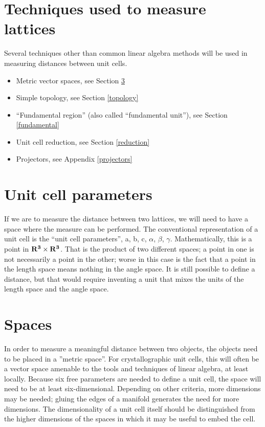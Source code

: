 \documentclass[preprint]{iucr}              %
\numberwithin{equation}{section}
\begin{document}
\section{Techniques used to measure lattices}

Several techniques other than common linear algebra methods will be used in measuring distances between unit cells.
\begin{itemize}
	\item 	Metric vector spaces, see Section \ref{spaces}
	\item 	Simple topology, see Section \ref{topology}
	\item   ``Fundamental region'' (also called ``fundamental unit''),
	see Section \ref{fundamental}
	\item 	Unit cell reduction, see Section \ref{reduction}
	\item 	Projectors, see Appendix \ref{projectors}

\end{itemize}	

\section{Unit cell parameters}

\label{unitcells}
If we are to measure the distance between two lattices, we will need
to have a space where the measure can be performed. The conventional 
representation of a unit cell is the ``unit cell parameters'', 
a, b, c, $\alpha$, $\beta$, $\gamma$. Mathematically, this is a
point in $\bf{R^3 \times R^3}$. That is the product of two different spaces; a
point in one is not necessarily a point in the other; worse in this
case is the fact that a point in the length space means nothing
in the angle space. It is still possible to define a distance, but 
that would require inventing a unit that mixes the units of the length
space and the angle space.
		
\section{Spaces}
\label{spaces}

In order to measure a meaningful distance between two objects, the objects need to
be placed in a ”metric space”. For crystallographic unit cells, this will often be a
vector space amenable to the tools and techniques of
linear algebra, at least locally. Because six free parameters are needed to define a unit
cell, the space will need to be at least six-dimensional. Depending on
other criteria, more dimensions may be needed; gluing the edges of
a manifold generates the need for more dimensions. The dimensionality of a unit cell itself should be distinguished from the higher dimensions of the spaces in which it may be useful to embed the cell.
\end{document}
